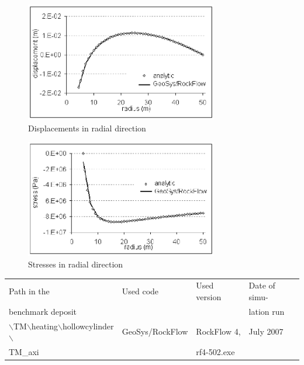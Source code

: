 \begin{figure}[htbp]
\centering
\includegraphics[width=0.75\textwidth]{TM/figures/fig611.eps}
\caption{Displacements in radial direction}
\label{fig611}
\end{figure}

\begin{figure}[htbp]
\centering
\includegraphics[width=0.75\textwidth]{TM/figures/fig612.eps}
\caption{Stresses in radial direction}
\label{fig612}
\end{figure}

\begin{tabular}{|l|l|l|l|}
\hline
Path in the & Used code	& Used version & Date of simu- \\
benchmark deposit	& & & lation run \\
\hline
$\backslash$TM$\backslash$heating$\backslash$hollowcylinder$\backslash$	& GeoSys/RockFlow	& RockFlow 4, & July 2007 \\
TM\_axi	& & rf4-502.exe & \\
\hline	
\end{tabular}

